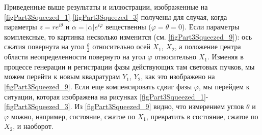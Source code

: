 Приведенные выше результаты и иллюстрации, изображенные на
\autoref{figPart3Squeezed_1}-\ref{figPart3Squeezed_3} получены для
случая, когда параметры $z = r e^{i\theta}$ и $\alpha =
\left|\alpha\right|e^{i \varphi}$ вещественны ($\varphi = \theta =
0$). Если параметры комплексные, то картинка несколько изменится
(см. \autoref{figPart3Squeezed_9}): ось сжатия повернута на угол $\frac{\theta}{2}$
относительно осей $X_1$, $X_2$, а положение центра области
неопределенности повернуто на угол $\varphi$ относительно
$X_1$. Изменяя в процессе генерации и регистрации фазы действующих там
световых пучков, мы можем перейти к новым квадратурам $Y_1$, $Y_2$, как
это изображено на \autoref{figPart3Squeezed_9}. Если еще компенсировать сдвиг фазы
$\varphi$, мы перейдем к ситуации, которая изображена на рисунках 
\ref{figPart3Squeezed_1}-\ref{figPart3Squeezed_3}. Из  
\autoref{figPart3Squeezed_9} видно, что измерением углов $\theta$ и
$\varphi$ можно, например, состояние, сжатое по $X_1$, превратить в
состояние, сжатое по $X_2$, и наоборот.

